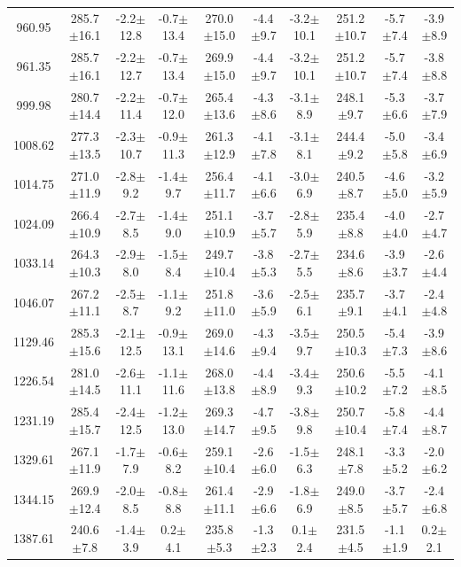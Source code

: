 \documentclass[agupp]{aguplus}              %
\begin{document}
\begin{article}
\begin{center}
\begin{table}[ht]
{\begin{tabular}{c|ccc|ccc|ccc}
960.95 & 285.7$\pm$16.1 & -2.2$\pm$12.8 & -0.7$\pm$13.4 & 270.0$\pm$15.0 & -4.4$\pm$9.7 & -3.2$\pm$10.1 & 251.2$\pm$10.7 & -5.7$\pm$7.4 & -3.9$\pm$8.9 \\ 
961.35 & 285.7$\pm$16.1 & -2.2$\pm$12.7 & -0.7$\pm$13.4 & 269.9$\pm$15.0 & -4.4$\pm$9.7 & -3.2$\pm$10.1 & 251.2$\pm$10.7 & -5.7$\pm$7.4 & -3.8$\pm$8.8 \\ 
\hline
999.98 & 280.7$\pm$14.4 & -2.2$\pm$11.4 & -0.7$\pm$12.0 & 265.4$\pm$13.6 & -4.3$\pm$8.6 & -3.1$\pm$8.9 & 248.1$\pm$9.7 & -5.3$\pm$6.6 & -3.7$\pm$7.9 \\ 
1008.62 & 277.3$\pm$13.5 & -2.3$\pm$10.7 & -0.9$\pm$11.3 & 261.3$\pm$12.9 & -4.1$\pm$7.8 & -3.1$\pm$8.1 & 244.4$\pm$9.2 & -5.0$\pm$5.8 & -3.4$\pm$6.9 \\ 
1014.75 & 271.0$\pm$11.9 & -2.8$\pm$9.2 & -1.4$\pm$9.7 & 256.4$\pm$11.7 & -4.1$\pm$6.6 & -3.0$\pm$6.9 & 240.5$\pm$8.7 & -4.6$\pm$5.0 & -3.2$\pm$5.9 \\ 
1024.09 & 266.4$\pm$10.9 & -2.7$\pm$8.5 & -1.4$\pm$9.0 & 251.1$\pm$10.9 & -3.7$\pm$5.7 & -2.8$\pm$5.9 & 235.4$\pm$8.8 & -4.0$\pm$4.0 & -2.7$\pm$4.7 \\ 
1033.14 & 264.3$\pm$10.3 & -2.9$\pm$8.0 & -1.5$\pm$8.4 & 249.7$\pm$10.4 & -3.8$\pm$5.3 & -2.7$\pm$5.5 & 234.6$\pm$8.6 & -3.9$\pm$3.7 & -2.6$\pm$4.4 \\ 
1046.07 & 267.2$\pm$11.1 & -2.5$\pm$8.7 & -1.1$\pm$9.2 & 251.8$\pm$11.0 & -3.6$\pm$5.9 & -2.5$\pm$6.1 & 235.7$\pm$9.1 & -3.7$\pm$4.1 & -2.4$\pm$4.8 \\ 
\hline
1129.46 & 285.3$\pm$15.6 & -2.1$\pm$12.5 & -0.9$\pm$13.1 & 269.0$\pm$14.6 & -4.3$\pm$9.4 & -3.5$\pm$9.7 & 250.5$\pm$10.3 & -5.4$\pm$7.3 & -3.9$\pm$8.6 \\ 
1226.54 & 281.0$\pm$14.5 & -2.6$\pm$11.1 & -1.1$\pm$11.6 & 268.0$\pm$13.8 & -4.4$\pm$8.9 & -3.4$\pm$9.3 & 250.6$\pm$10.2 & -5.5$\pm$7.2 & -4.1$\pm$8.5 \\ 
1231.19 & 285.4$\pm$15.7 & -2.4$\pm$12.5 & -1.2$\pm$13.0 & 269.3$\pm$14.7 & -4.7$\pm$9.5 & -3.8$\pm$9.8 & 250.7$\pm$10.4 & -5.8$\pm$7.4 & -4.4$\pm$8.7 \\ 
\hline
1329.61 & 267.1$\pm$11.9 & -1.7$\pm$7.9 & -0.6$\pm$8.2 & 259.1$\pm$10.4 & -2.6$\pm$6.0 & -1.5$\pm$6.3 & 248.1$\pm$7.8 & -3.3$\pm$5.2 & -2.0$\pm$6.2 \\ 
1344.15 & 269.9$\pm$12.4 & -2.0$\pm$8.5 & -0.8$\pm$8.8 & 261.4$\pm$11.1 & -2.9$\pm$6.6 & -1.8$\pm$6.9 & 249.0$\pm$8.5 & -3.7$\pm$5.7 & -2.4$\pm$6.8 \\ 
1387.61 & 240.6$\pm$7.8 & -1.4$\pm$3.9 &  0.2$\pm$4.1 & 235.8$\pm$5.3 & -1.3$\pm$2.3 &  0.1$\pm$2.4 & 231.5$\pm$4.5 & -1.1$\pm$1.9 &  0.2$\pm$2.1 \\ 

\end{tabular}}
\end{table}
\end{center}
\end{article}
\end{document}
